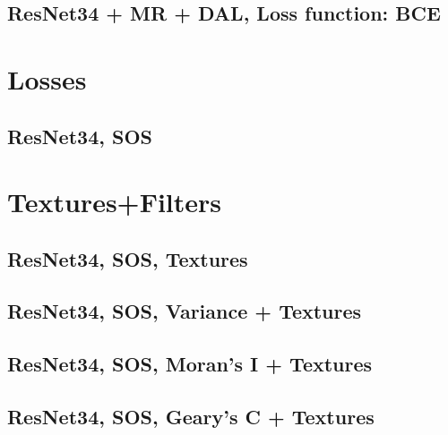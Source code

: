 \documentclass{article}
\begin{document}
\subsection{ResNet34 + MR + DAL, Loss function: BCE}


\section{Losses}
\subsection{ResNet34, SOS}


\section{Textures+Filters}
\subsection{ResNet34, SOS, Textures}


\subsection{ResNet34, SOS, Variance + Textures}


\subsection{ResNet34, SOS, Moran's I + Textures}


\subsection{ResNet34, SOS, Geary's C + Textures}

\end{document}
